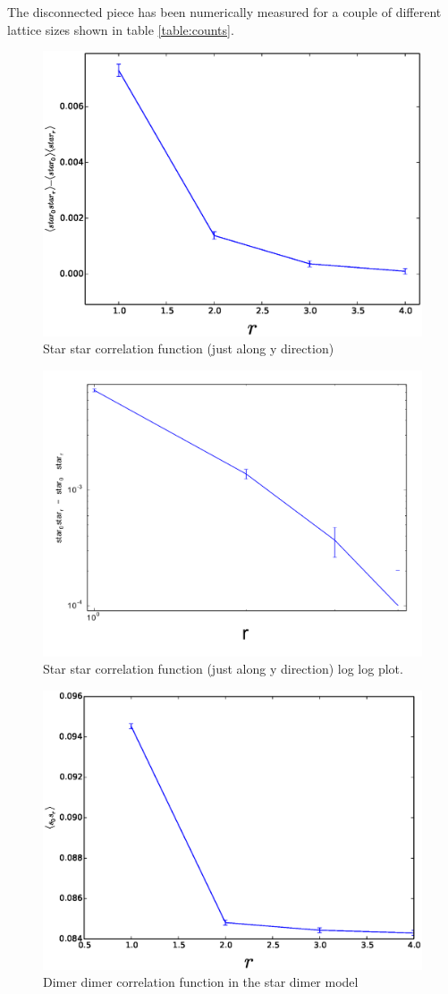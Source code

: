 \documentclass[aps,floatfix,11pt]{revtex4-1}
\begin{document}
\noindent
The disconnected piece has been numerically measured for a couple of different lattice sizes shown
in table \ref{table:counts}.

\begin{figure}[h]
    \centering
    \includegraphics[width=8.5 cm]{star_star_cor}
    \caption{Star star correlation function (just along y direction) \label{fig:star_star_cor}}
\end{figure}

\begin{figure}[h]
    \centering
    \includegraphics[width=8.5 cm]{star_star_cor_log}
    \caption{Star star correlation function (just along y direction) log log plot.\label{fig:star_star_cor_log}}
\end{figure}

\begin{figure}[h]
    \centering
    \includegraphics[width=8.5 cm]{s_dimer_dimer_cor}
    \caption{Dimer dimer correlation function in the star dimer model \label{fig:s_dimer_dimer}}
\end{figure}
\end{document}
